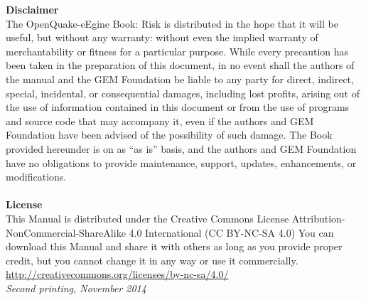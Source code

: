 \noindent
   {\bf{Disclaimer}} \hfill \\
   The OpenQuake-eEgine Book: Risk is distributed in the hope that it will be useful, but without any warranty: without even the implied warranty of merchantability or fitness for a particular purpose. While every precaution has been taken in the preparation of this document, in no event shall the authors of the manual and the GEM Foundation be liable to any party for direct, indirect, special, incidental, or consequential damages, including lost profits, arising out of the use of information contained in this document or from the use of programs and source code that may accompany it, even if the authors and GEM Foundation have been advised of the possibility of such damage. The Book provided hereunder is on as ``as is'' basis, and the authors and GEM Foundation have no obligations to provide maintenance, support, updates, enhancements, or modifications. \hfill \\
   \hfill \\
\noindent
   {\bf{License}} \hfill \\
   This Manual is distributed under the Creative Commons License 
   Attribution-NonCommercial-ShareAlike 4.0 International (CC BY-NC-SA 4.0)
   You can download this Manual and share it with 
   others as long as you provide proper credit, but you cannot change 
   it in any way or use it commercially.\hfill \\
   \href{http://creativecommons.org/licenses/by-nc-sa/4.0/}
   {http://creativecommons.org/licenses/by-nc-sa/4.0/}\hfill \\

\noindent \textit{Second printing, November 2014} %